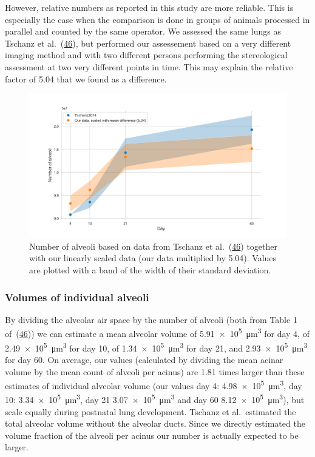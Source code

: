 \documentclass[
  american,
]{article}
\begin{document}
However, relative numbers as reported in this study are more reliable.
This is especially the case when the comparison is done in groups of animals processed in parallel and counted by the same operator.
We assessed the same lungs as Tschanz et al.~(\protect\hyperlink{ref-wnl86DEM}{46}), but performed our assessement based on a very different imaging method and with two different persons performing the stereological assessment at two very different points in time.
This may explain the relative factor of 5.04 that we found as a difference.

\begin{figure}
\hypertarget{fig:08}{%
\centering
\includegraphics{images/fig08.png}
\caption{Number of alveoli based on data from Tschanz et al.~(\protect\hyperlink{ref-wnl86DEM}{46}) together with our linearly scaled data (our data multiplied by 5.04).
Values are plotted with a band of the width of their standard deviation.}\label{fig:08}
}
\end{figure}

\hypertarget{volumes-of-individual-alveoli}{%
\subsubsection{Volumes of individual alveoli}\label{volumes-of-individual-alveoli}}

By dividing the alveolar air space by the number of alveoli (both from Table 1 of~(\protect\hyperlink{ref-wnl86DEM}{46})) we can estimate a mean alveolar volume of 5.91~×~10\textsuperscript{5}~μm\textsuperscript{3} for day 4, of 2.49~×~10\textsuperscript{5}~μm\textsuperscript{3} for day 10, of 1.34~×~10\textsuperscript{5}~μm\textsuperscript{3} for day 21, and 2.93~×~10\textsuperscript{5}~μm\textsuperscript{3} for day 60.
On average, our values (calculated by dividing the mean acinar volume by the mean count of alveoli per acinus) are 1.81 times larger than these estimates of individual alveolar volume (our values day 4: 4.98~×~10\textsuperscript{5}~μm\textsuperscript{3}, day 10: 3.34~×~10\textsuperscript{5}~μm\textsuperscript{3}, day 21 3.07~×~10\textsuperscript{5}~μm\textsuperscript{3} and day 60 8.12~×~10\textsuperscript{5}~μm\textsuperscript{3}), but scale equally during postnatal lung development.
Tschanz et al.~estimated the total alveolar volume without the alveolar ducts.
Since we directly estimated the volume fraction of the alveoli per acinus our number is actually expected to be larger.
\end{document}
